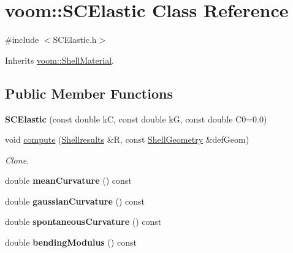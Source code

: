 \hypertarget{classvoom_1_1_s_c_elastic}{
\section{voom::SCElastic Class Reference}
\label{classvoom_1_1_s_c_elastic}
}


{\ttfamily \#include $<$SCElastic.h$>$}

Inherits \hyperlink{classvoom_1_1_shell_material}{voom::ShellMaterial}.\subsection*{Public Member Functions}
\begin{DoxyCompactItemize}
\item 
\hypertarget{classvoom_1_1_s_c_elastic_a6a9371f1418cb284e22ff450c338c0f7}{
{\bfseries SCElastic} (const double kC, const double kG, const double C0=0.0)}
\label{classvoom_1_1_s_c_elastic_a6a9371f1418cb284e22ff450c338c0f7}

\item 
void \hyperlink{classvoom_1_1_s_c_elastic_ab492944d398efffa67fa3763a1cbd7fc}{compute} (\hyperlink{structvoom_1_1_shell_material_1_1_shellresults}{Shellresults} \&R, const \hyperlink{classvoom_1_1_shell_geometry}{ShellGeometry} \&defGeom)
\begin{DoxyCompactList}\small\item\em Clone. \item\end{DoxyCompactList}\item 
\hypertarget{classvoom_1_1_s_c_elastic_a159983a24bc5761e4623a969cbfff9b2}{
double {\bfseries meanCurvature} () const }
\label{classvoom_1_1_s_c_elastic_a159983a24bc5761e4623a969cbfff9b2}

\item 
\hypertarget{classvoom_1_1_s_c_elastic_a9858a77a638480511f51cb5bb47378e5}{
double {\bfseries gaussianCurvature} () const }
\label{classvoom_1_1_s_c_elastic_a9858a77a638480511f51cb5bb47378e5}

\item 
\hypertarget{classvoom_1_1_s_c_elastic_a74dcbe37b0b5a016f988f3b9bafcb77c}{
double {\bfseries spontaneousCurvature} () const }
\label{classvoom_1_1_s_c_elastic_a74dcbe37b0b5a016f988f3b9bafcb77c}

\item 
\hypertarget{classvoom_1_1_s_c_elastic_ab076aa8998ccd456ac0d7f84d5eb3a43}{
double {\bfseries bendingModulus} () const }
\label{classvoom_1_1_s_c_elastic_ab076aa8998ccd456ac0d7f84d5eb3a43}


\end{DoxyCompactItemize}
